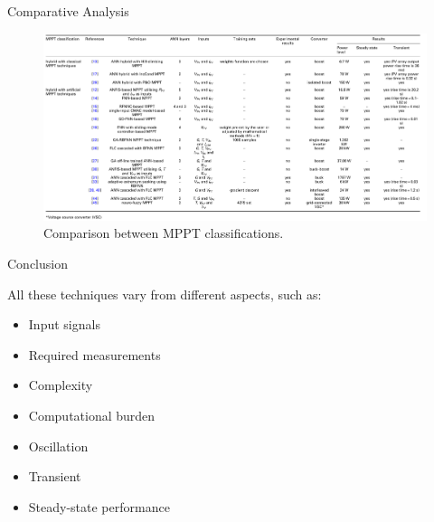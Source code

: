 \documentclass[10pt]{beamer}
\begin{document}
\begin{frame}{Comparative Analysis}
	\begin{figure}
	\centerline{\includegraphics[scale=.23]{comparativeanalysis.png}}
	\caption{Comparison between MPPT classifications.}
    \label{fig:hybridann}
\end{figure}
\end{frame}

\begin{frame}{Conclusion}
\begin{alertblock}{All these techniques vary from different aspects,
such as:}
	\begin{itemize}
    	\item{Input signals}
        \item{Required measurements}
        \item{Complexity}
        \item{Computational burden}
        \item{Oscillation}
        \item{Transient}
        \item{Steady-state performance}
    \end{itemize}
\end{alertblock}
\end{frame}
\end{document}
